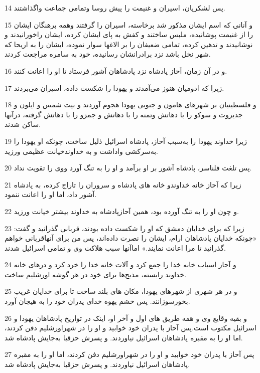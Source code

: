 \par 14 پس لشکریان، اسیران و غنیمت را پیش روسا وتمامی جماعت واگذاشتند.
\par 15 و آنانی که اسم ایشان مذکور شد برخاسته، اسیران را گرفتند وهمه برهنگان ایشان را از غنیمت پوشانیده، ملبس ساختند و کفش به پای ایشان کرده، ایشان راخورانیدند و نوشانیدند و تدهین کرده، تمامی ضعیفان را بر الاغها سوار نموده، ایشان را به اریحا که شهر نخل باشد نزد برادرانشان رسانیده، خود به سامره مراجعت کردند.
\par 16 و در آن زمان، آحاز پادشاه نزد پادشاهان آشور فرستاد تا او را اعانت کنند.
\par 17 زیرا که ادومیان هنوز می‌آمدند و یهودا را شکست داده، اسیران می‌بردند.
\par 18 و فلسطینیان بر شهرهای هامون و جنوبی یهودا هجوم آوردند و بیت شمس و ایلون و جدیروت و سوکو را با دهاتش وتمنه را با دهاتش و جمزو را با دهاتش گرفته، درآنها ساکن شدند.
\par 19 زیرا خداوند یهودا را به‌سبب آحاز، پادشاه اسرائیل ذلیل ساخت، چونکه او یهودا را به‌سرکشی واداشت و به خداوندخیانت عظیمی ورزید.
\par 20 پس تلغت فلناسر، پادشاه آشور بر او برآمد و او را به تنگ آورد ووی را تقویت نداد.
\par 21 زیرا که آحاز خانه خداوندو خانه های پادشاه و سروران را تاراج کرده، به پادشاه آشور داد، اما او را اعانت ننمود.
\par 22 و چون او را به تنگ آورده بود، همین آحازپادشاه به خداوند بیشتر خیانت ورزید.
\par 23 زیرا که برای خدایان دمشق که او را شکست داده بودند، قربانی گذرانید و گفت: «چونکه خدایان پادشاهان ارام، ایشان را نصرت داده‌اند، پس من برای آنهاقربانی خواهم گذرانید تا مرا اعانت نمایند.» اماآنها سبب هلاکت وی و تمامی اسرائیل شدند.
\par 24 و آحاز اسباب خانه خدا را جمع کرد و آلات خانه خدا را خرد کرد و درهای خانه خداوند رابسته، مذبح‌ها برای خود در هر گوشه اورشلیم ساخت.
\par 25 و در هر شهری از شهرهای یهودا، مکان های بلند ساخت تا برای خدایان غریب بخور‌سوزانند. پس خشم یهوه خدای پدران خود را به هیجان آورد.
\par 26 و بقیه وقایع وی و همه طریق های اول و آخر او، اینک در تواریخ پادشاهان یهودا و اسرائیل مکتوب است.پس آحاز با پدران خود خوابید و او را در شهراورشلیم دفن کردند، اما او را به مقبره پادشاهان اسرائیل نیاوردند. و پسرش حزقیا به‌جایش پادشاه شد.
\par 27 پس آحاز با پدران خود خوابید و او را در شهراورشلیم دفن کردند، اما او را به مقبره پادشاهان اسرائیل نیاوردند. و پسرش حزقیا به‌جایش پادشاه شد.
 
